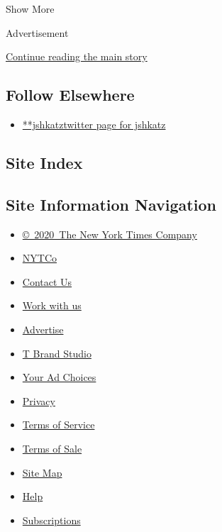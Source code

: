 Show More

Advertisement

\protect\hyperlink{after-mid2}{Continue reading the main story}

\hypertarget{follow-elsewhere}{%
\subsection{Follow Elsewhere}\label{follow-elsewhere}}

\begin{itemize}
\tightlist
\item
  \href{https://twitter.com/jshkatz}{**jshkatztwitter page for jshkatz}
\end{itemize}

\hypertarget{site-index}{%
\subsection{Site Index}\label{site-index}}

\hypertarget{site-information-navigation}{%
\subsection{Site Information
Navigation}\label{site-information-navigation}}

\begin{itemize}
\tightlist
\item
  \href{https://help.nytimes.com/hc/en-us/articles/115014792127-Copyright-notice}{©~2020~The
  New York Times Company}
\end{itemize}

\begin{itemize}
\tightlist
\item
  \href{https://www.nytco.com/}{NYTCo}
\item
  \href{https://help.nytimes.com/hc/en-us/articles/115015385887-Contact-Us}{Contact
  Us}
\item
  \href{https://www.nytco.com/careers/}{Work with us}
\item
  \href{https://nytmediakit.com/}{Advertise}
\item
  \href{http://www.tbrandstudio.com/}{T Brand Studio}
\item
  \href{https://www.nytimes.com/privacy/cookie-policy\#how-do-i-manage-trackers}{Your
  Ad Choices}
\item
  \href{https://www.nytimes.com/privacy}{Privacy}
\item
  \href{https://help.nytimes.com/hc/en-us/articles/115014893428-Terms-of-service}{Terms
  of Service}
\item
  \href{https://help.nytimes.com/hc/en-us/articles/115014893968-Terms-of-sale}{Terms
  of Sale}
\item
  \href{https://spiderbites.nytimes.com}{Site Map}
\item
  \href{https://help.nytimes.com/hc/en-us}{Help}
\item
  \href{https://www.nytimes.com/subscription?campaignId=37WXW}{Subscriptions}
\end{itemize}
